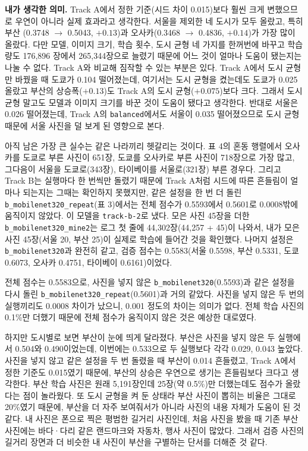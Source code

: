 \documentclass[11pt]{article}
\begin{document}
\textbf{내가 생각한 의미.} Track A에서 정한 기준(시드 차이 0.015)보다 훨씬 크게 변했으므로
우연이 아니라 실제 효과라고 생각한다. 서울을 제외한 네 도시가 모두 올랐고, 특히 부산
(0.3748 $\to$ 0.5043, $+0.13$)과 오사카(0.3468 $\to$ 0.4836, $+0.14$)가 가장 많이 올랐다.
다만 모델, 이미지 크기, 학습 횟수, 도시 균형 네 가지를 한꺼번에 바꾸고 학습량도 176,896
장에서 265,344장으로 늘렸기 때문에 어느 것이 얼마나 도움이 됐는지는 나눌 수 없다. Track
A와 비교해 짐작할 수 있는 부분은 있다. Track A에서 도시 균형만 바꿨을 때 도쿄가 0.104
떨어졌는데, 여기서는 도시 균형을 켰는데도 도쿄가 0.025 올랐고 부산의 상승폭($+0.13$)도
Track A의 도시 균형($+0.075$)보다 크다. 그래서 도시 균형 말고도 모델과 이미지 크기를
바꾼 것이 도움이 됐다고 생각한다. 반대로 서울은 0.026 떨어졌는데, Track A의
\texttt{balanced}에서도 서울이 0.035 떨어졌으므로 도시 균형 때문에 서울 사진을 덜 보게 된
영향으로 본다.

아직 남은 가장 큰 실수는 같은 나라끼리 헷갈리는 것이다. 표 4의 혼동 행렬에서
오사카를 도쿄로 부른 사진이 651장, 도쿄를 오사카로 부른 사진이 718장으로 가장 많고,
그다음이 서울을 도쿄로(343장), 타이베이를 서울로(321장) 부른 경우다. 그리고 Track B는
실행마다 한 번씩만 돌렸기 때문에 Track A처럼 시드에 따른 흔들림이 얼마나 되는지는 그때는
확인하지 못했지만, 같은 설정을 한 번 더 돌린 \texttt{b\_mobilenet320\_repeat}(표 3)에서는
전체 점수가 0.5593에서 0.5601로 0.0008밖에 움직이지 않았다. 이 모델을 \texttt{track-b-2}로
냈다. 모은 사진 45장을 더한 \texttt{b\_mobilenet320\_mine2}는 로그 첫 줄에 44,302장(44,257 +
45)이 나와서, 내가 모은 사진 45장(서울 20, 부산 25)이 실제로 학습에 들어간 것을 확인했다.
나머지 설정은 \texttt{b\_mobilenet320}과 완전히 같고, 검증 점수는 0.5583(서울 0.5598, 부산
0.5331, 도쿄 0.6073, 오사카 0.4751, 타이베이 0.6161)이었다.

전체 점수는 0.5583으로, 사진을 넣지 않은 \texttt{b\_mobilenet320}(0.5593)과 같은 설정을 다시
돌린 \texttt{b\_mobilenet320\_repeat}(0.5601)과 거의 같았다. 사진을 넣지 않은 두 번의
실행끼리도 0.0008 차이가 났으니, 0.001 정도의 차이는 의미가 없다. 전체 학습 사진의
0.1\%만 더했기 때문에 전체 점수가 움직이지 않은 것은 예상한 대로였다.

하지만 도시별로 보면 부산이 눈에 띄게 달라졌다. 부산은 사진을 넣지 않은 두 실행에서 0.504와
0.490이었는데, 이번에는 0.533으로 두 실행보다 각각 0.029, 0.043 높았다. 사진을 넣지 않고
같은 설정을 두 번 돌렸을 때 부산이 0.014 흔들렸고, Track A에서 정한 기준도 0.015였기
때문에, 부산의 상승은 우연으로 생기는 흔들림보다 크다고 생각한다. 부산 학습 사진은 원래
5,191장인데 25장(약 0.5\%)만 더했는데도 점수가 올랐다는 점이 놀라웠다. 또 도시 균형을 켜 둔
상태라 부산 사진이 뽑히는 비율은 그대로 20\%였기 때문에, 부산을 더 자주 보여줘서가 아니라
사진의 내용 자체가 도움이 된 것 같다. 내 사진은 폰으로 찍은 평범한 길거리 사진인데, 처음
사진을 봤을 때 기존 부산 사진에는 바다·다리 같은 랜드마크와 자동차, 행사 사진이 많았다.
그래서 검증 사진의 길거리 장면과 더 비슷한 내 사진이 부산을 구별하는 단서를 더해준 것 같다.
\end{document}
